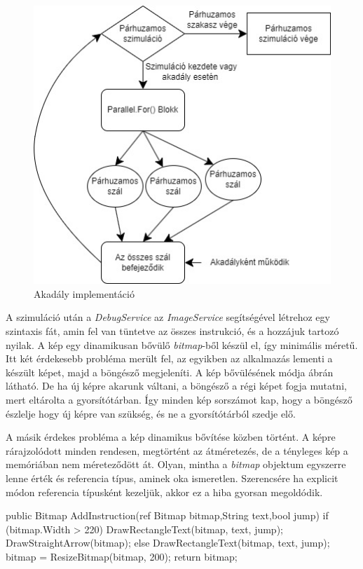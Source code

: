 \begin{figure}[h]
\centering
\includegraphics[scale=0.7]{images/Barrier.jpg}
\caption{Akadály implementáció}
\label{fig:Barrier}
\end{figure}

A szimuláció után a \textit{DebugService} az \textit{ImageService} segítségével létrehoz egy szintaxis fát, amin fel van tüntetve az összes instrukció, és a hozzájuk tartozó nyilak. A kép egy dinamikusan bővülő \textit{bitmap}-ből készül el, így minimális méretű. Itt két érdekesebb probléma merült fel, az egyikben az alkalmazás lementi a készült képet, majd a böngésző megjeleníti. A kép bővülésének módja  ábrán látható. De ha új képre akarunk váltani, a böngésző a régi képet fogja mutatni, mert eltárolta a gyorsítótárban. Így minden kép sorszámot kap, hogy a böngésző észlelje hogy új képre van szükség, és ne a gyorsítótárból szedje elő. 

A másik érdekes probléma a kép dinamikus bővítése közben történt. A képre rárajzolódott minden rendesen, megtörtént az átméretezés, de a tényleges kép a memóriában nem méreteződött át. Olyan, mintha a \textit{bitmap} objektum egyszerre lenne érték és referencia típus, aminek oka ismeretlen. Szerencsére ha explicit módon referencia típusként kezeljük, akkor ez a hiba gyorsan megoldódik.

\begin{cpp}
public Bitmap AddInstruction(ref Bitmap bitmap,String text,bool jump)
{
      if (bitmap.Width > 220)
      {
           DrawRectangleText(bitmap, text, jump);
           DrawStraightArrow(bitmap);
       }
       else
       {
           DrawRectangleText(bitmap, text, jump);
       }
       bitmap = ResizeBitmap(bitmap, 200);
       return bitmap;
}
\end{cpp}

